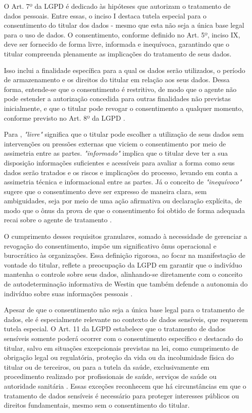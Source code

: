 O Art. 7º da LGPD \cite{Brasil2018lgpd} é dedicado às hipóteses que autorizam o tratamento de dados pessoais. Entre essas, o inciso I destaca tutela especial para o consentimento do titular dos dados - mesmo que esta não seja a única base legal para o uso de dados. O consentimento, conforme definido no Art. 5º, inciso IX, deve ser fornecido de forma livre, informada e inequívoca, garantindo que o titular compreenda plenamente as implicações do tratamento de seus dados.

Isso inclui a finalidade específica para a qual os dados serão utilizados, o período de armazenamento e os direitos do titular em relação aos seus dados. Dessa forma, entende-se que o consentimento é restritivo, de modo que o agente não pode estender a autorização concedida para outras finalidades não previstas inicialmente, e que o titular pode revogar o consentimento a qualquer momento, conforme previsto no Art. 8º da LGPD \cite{Brasil2018lgpd}.

Para , \textit{"livre"} significa que o titular pode escolher a utilização de seus dados sem intervenções ou pressões externas que viciem o consentimento por meio de assimetria entre as partes. \textit{"informado"} implica que o titular deve ter a sua disposição informações suficientes e acessíveis para avaliar a forma como seus dados serão tratados e os riscos e implicações do processo, levando em conta a assimetria técnica e informacional entre as partes. Já o conceito de \textit{"inequívoco"} sugere que o consentimento deve ser expresso de maneira clara, sem ambiguidades, seja por meio de uma ação afirmativa ou declaração explícita, de modo que o ônus da prova de que o consentimento foi obtido de forma adequada recai sobre o agente de tratamento \cite{TefferViola2020}.

O cumprimento desses requisitos granulares, somado à necessidade de gerenciar a revogação do consentimento, impõe um significativo ônus operacional e burocrático às organizações. Essa definição rigorosa, ao focar na manifestação de vontade do titular, reflete a preocupação da LGPD em garantir que o indivíduo mantenha o controle sobre seus dados, alinhando-se diretamente com o conceito de autodeterminação informativa de Westin que também defende a autonomia do indivíduo sobre suas informações pessoais \cite{Westin1967}.

Apesar de que o consentimento não seja a única base legal para o tratamento de dados, ele é especialmente relevante no contexto de dados sensíveis, que requerem tutela especial. O Art. 11 da LGPD estabelece que o tratamento de dados sensíveis somente poderá ocorrer com o consentimento específico e destacado do titular, salvo em situações excepcionais previstas na lei, como cumprimento de obrigação legal ou regulatória, proteção da vida ou da incolumidade física do titular ou de terceiros, ou para a tutela da saúde, exclusivamente em procedimento realizado por profissionais de saúde, serviços de saúde ou autoridade sanitária \cite{Brasil2018lgpd}. Essas exceções reconhecem que há circunstâncias em que o tratamento de dados sensíveis é necessário para proteger interesses públicos ou direitos fundamentais, mesmo sem o consentimento do titular.

